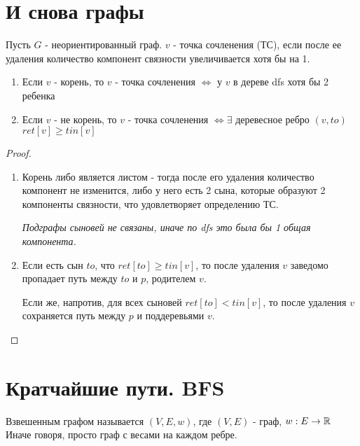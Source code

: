 
\section{И снова графы}

\begin{definition}
  Пусть $G$ - неориентированный граф. $v$ - точка сочленения (ТС), если после ее удаления количество компонент связности увеличивается хотя бы на 1.
\end{definition}

\begin{proposition}
  \text{}

  \begin{enumerate}
    \item Если $v$ - корень, то $v$ - точка сочленения $\Longleftrightarrow$ у $v$ в дереве dfs хотя бы 2 ребенка
    \item Если $v$ - не корень, то $v$ - точка сочленения $\Longleftrightarrow \exists$ деревесное ребро $(v, to)$ $ret[v] \ge tin[v]$
  \end{enumerate}
\end{proposition}

\begin{proof}
  \text{}

  \begin{enumerate}
    \item Корень либо является листом - тогда после его удаления количество компонент не изменится, либо у него есть 2 сына, которые образуют 2 компоненты связности, что удовлетворяет определению ТС.
  
\textit{Подграфы сыновей не связаны, иначе по dfs это была бы 1 общая компонента.}
    \item Если есть сын $to$, что $ret[to] \ge tin[v]$, то после удаления $v$ заведомо пропадает путь между $to$ и $p$, родителем $v$.
    
    Если же, напротив, для всех сыновей $ret[to] < tin[v]$, то после удаления $v$ сохраняется путь между $p$ и поддеревьями $v$. 
  \end{enumerate}
\end{proof}
\section{Кратчайшие пути. BFS}

\begin{definition}
  Взвешенным графом называется $(V, E, w)$, где $(V, E)$ - граф, $w: E \to \mathbb{R}$ Иначе говоря, просто граф с весами на каждом ребре.
\end{definition}

